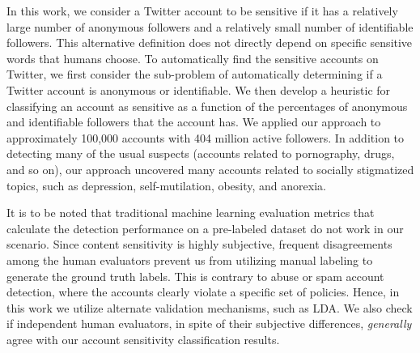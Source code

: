 \documentclass[conference]{IEEEtran}
\begin{document}
In this work, we consider a Twitter account to be sensitive if it has a relatively large number of anonymous followers and a relatively small number of identifiable followers. This alternative definition does not directly depend on specific sensitive words that humans choose. 
To  automatically find the sensitive accounts on Twitter, we first consider the sub-problem of automatically determining if a Twitter account is anonymous or identifiable.  
We then develop a heuristic for classifying an account as sensitive as a function of the percentages of anonymous and identifiable followers that the account has.
We applied our approach to approximately 100,000 accounts with 404 million active followers. 
In addition to detecting many of the usual suspects (accounts related to pornography, drugs, and so on), our approach uncovered many accounts related to socially stigmatized topics, such as depression, self-mutilation, obesity, and anorexia. 

It is to be noted that traditional machine learning evaluation metrics that calculate the detection performance on a pre-labeled dataset do not work in our scenario. Since content sensitivity is highly subjective, frequent disagreements among the human evaluators prevent us from utilizing manual labeling to generate the ground truth labels. This is contrary to abuse or spam account detection, where the accounts clearly violate a specific set of policies. Hence, in this work we utilize alternate validation mechanisms, such as LDA. We also check if independent human evaluators, in spite of their subjective differences, \textit{generally} agree with our account sensitivity classification results. 
 
\end{document}
